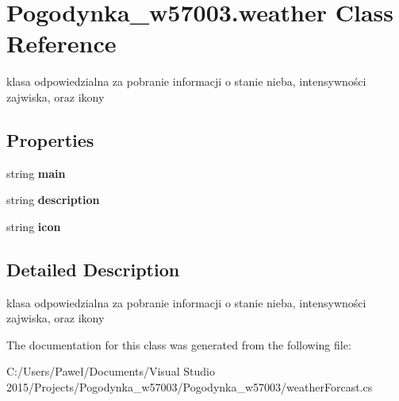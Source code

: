 \hypertarget{class_pogodynka__w57003_1_1weather}{}\section{Pogodynka\+\_\+w57003.\+weather Class Reference}
\label{class_pogodynka__w57003_1_1weather}


klasa odpowiedzialna za pobranie informacji o stanie nieba, intensywności zajwiska, oraz ikony  


\subsection*{Properties}
\begin{DoxyCompactItemize}
\item 
\mbox{\label{class_pogodynka__w57003_1_1weather_ae2f706e831883a287c6b981b6d1f6f8d}} 
string {\bfseries main}
\item 
\mbox{\label{class_pogodynka__w57003_1_1weather_a255f65b78a033aef4fe167c578147b85}} 
string {\bfseries description}
\item 
\mbox{\label{class_pogodynka__w57003_1_1weather_aeede86305665ee36d43a64e0d28c1c65}} 
string {\bfseries icon}
\end{DoxyCompactItemize}


\subsection{Detailed Description}
klasa odpowiedzialna za pobranie informacji o stanie nieba, intensywności zajwiska, oraz ikony 



The documentation for this class was generated from the following file\+:\begin{DoxyCompactItemize}
\item 
C\+:/\+Users/\+Paweł/\+Documents/\+Visual Studio 2015/\+Projects/\+Pogodynka\+\_\+w57003/\+Pogodynka\+\_\+w57003/weather\+Forcast.\+cs\end{DoxyCompactItemize}
